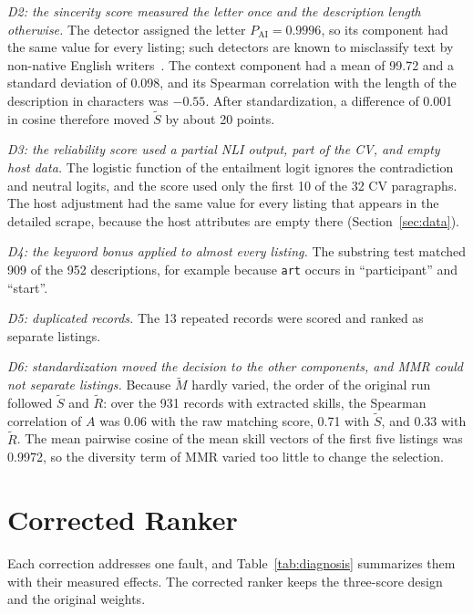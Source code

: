 \documentclass[CHICAGO]{USG}
\begin{document}
\emph{D2: the sincerity score measured the letter once and the description length otherwise.} The detector assigned the letter $P_{\mathrm{AI}}=0.9996$, so its component had the same value for every listing; such detectors are known to misclassify text by non-native English writers~\citep{liang2023}. %
The context component had a mean of 99.72 and a standard deviation of 0.098, and its Spearman correlation with the length of the description in characters was $-0.55$. %
After standardization, a difference of 0.001 in cosine therefore moved $\tilde{S}$ by about 20 points.

\emph{D3: the reliability score used a partial NLI output, part of the CV, and empty host data.} The logistic function of the entailment logit ignores the contradiction and neutral logits, and the score used only the first 10 of the 32 CV paragraphs. %
The host adjustment had the same value for every listing that appears in the detailed scrape, because the host attributes are empty there (Section~\ref{sec:data}).

\emph{D4: the keyword bonus applied to almost every listing.} The substring test matched 909 of the 952 descriptions, for example because \texttt{art} occurs in ``participant'' and ``start''. %

\emph{D5: duplicated records.} The 13 repeated records were scored and ranked as separate listings. %

\emph{D6: standardization moved the decision to the other components, and MMR could not separate listings.} Because $\tilde{M}$ hardly varied, the order of the original run followed $\tilde{S}$ and $\tilde{R}$: over the 931 records with extracted skills, the Spearman correlation of $A$ was 0.06 with the raw matching score, 0.71 with $\tilde{S}$, and 0.33 with $\tilde{R}$. %
The mean pairwise cosine of the mean skill vectors of the first five listings was 0.9972, so the diversity term of MMR varied too little to change the selection. %

\section{Corrected Ranker}
\label{sec:corrected}

Each correction addresses one fault, and Table~\ref{tab:diagnosis} summarizes them with their measured effects. The corrected ranker keeps the three-score design and the original weights.
\end{document}
